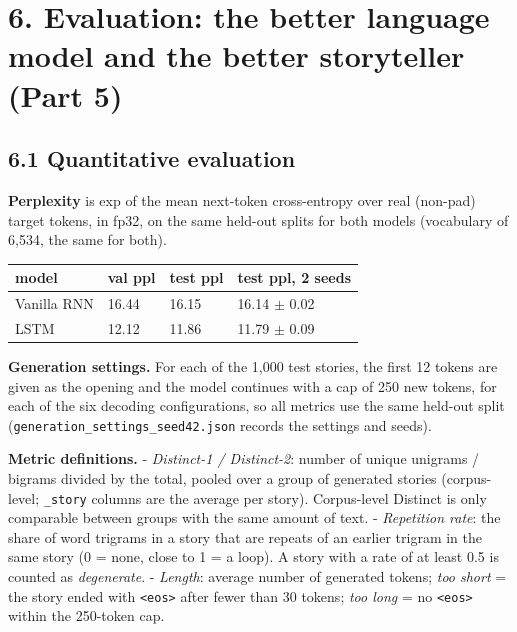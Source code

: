 \documentclass[10pt,a4paper]{article}
\begin{document}
\hypertarget{evaluation-the-better-language-model-and-the-better-storyteller-part-5}{%
\section{6. Evaluation: the better language model and the better storyteller (Part 5)}\label{evaluation-the-better-language-model-and-the-better-storyteller-part-5}}

\hypertarget{quantitative-evaluation}{%
\subsection{6.1 Quantitative evaluation}\label{quantitative-evaluation}}

\textbf{Perplexity} is exp of the mean next-token cross-entropy over real (non-pad) target tokens, in fp32, on the same
held-out splits for both models (vocabulary of 6,534, the same for both).

\begin{longtable}[]{@{}llll@{}}
\toprule\noalign{}
model & val ppl & test ppl & test ppl, 2 seeds \\
\midrule\noalign{}
\endhead
\bottomrule\noalign{}
\endlastfoot
Vanilla RNN & 16.44 & 16.15 & 16.14 \ensuremath{\pm} 0.02 \\
LSTM & 12.12 & 11.86 & 11.79 \ensuremath{\pm} 0.09 \\
\end{longtable}

\textbf{Generation settings.} For each of the 1,000 test stories, the first 12 tokens are given as the opening and the
model continues with a cap of 250 new tokens, for each of the six decoding configurations, so all metrics use the
same held-out split (\texttt{generation\_settings\_seed42.json} records the settings and seeds).

\textbf{Metric definitions.}
- \emph{Distinct-1 / Distinct-2}: number of unique unigrams / bigrams divided by the total, pooled over a group of
generated stories (corpus-level; \texttt{\_story} columns are the average per story). Corpus-level Distinct is only
comparable between groups with the same amount of text.
- \emph{Repetition rate}: the share of word trigrams in a story that are repeats of an earlier trigram in the same story
(0 = none, close to 1 = a loop). A story with a rate of at least 0.5 is counted as \emph{degenerate}.
- \emph{Length}: average number of generated tokens; \emph{too short} = the story ended with \texttt{\textless{}eos\textgreater{}} after fewer than 30 tokens;
\emph{too long} = no \texttt{\textless{}eos\textgreater{}} within the 250-token cap.
\end{document}
